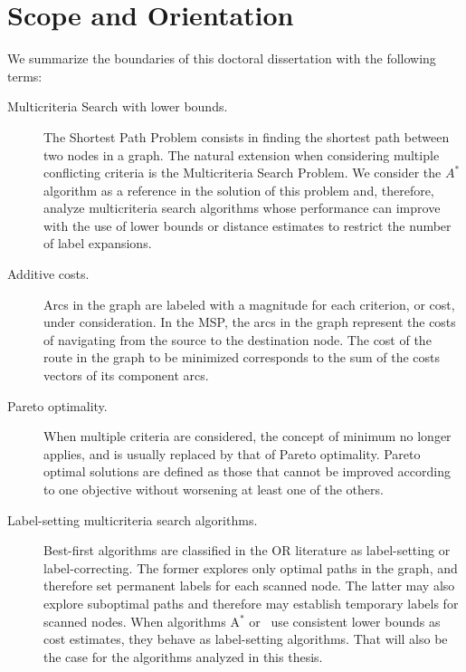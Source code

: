 \section{Scope and Orientation}
\label{ChapIntroduction:sec:orientation}

We summarize the boundaries of this doctoral dissertation with the following terms:

\begin{description}
	
	\item[Multicriteria Search with lower bounds.] The Shortest Path Problem consists in finding the shortest path between two nodes in a graph. The natural extension when considering multiple conflicting criteria is the Multicriteria Search Problem. We consider the $A^*$ algorithm as a reference in the solution of this problem and, therefore, analyze multicriteria search algorithms whose
performance can improve with the use of lower bounds or distance estimates to restrict the number of label expansions.
	
	\item[Additive costs.] Arcs in the graph are labeled with a magnitude for each criterion, or cost, under consideration. In the MSP, the arcs in the graph represent the costs of navigating from the source to the destination node. The cost of the route in the graph to be minimized corresponds to the sum of the costs vectors of its component arcs. 
	
	\item[Pareto optimality.] When multiple criteria are considered, the concept of minimum no longer applies, and is usually replaced by that of Pareto optimality. Pareto optimal solutions are defined as those that cannot be improved according to one objective without worsening at least one of the others.
	
	\item[Label-setting multicriteria search algorithms.] 
Best-first algorithms are classified in the OR literature as label-setting or label-correcting. The former explores only optimal paths in the graph, and therefore set permanent labels for each scanned node. The latter may also explore suboptimal paths and therefore may establish temporary labels for scanned nodes. When algorithms A$^*$ or \namoa \ use consistent lower bounds as cost estimates, they behave as label-setting algorithms. That will also be the case for the algorithms analyzed in this thesis.
	

\end{description}
